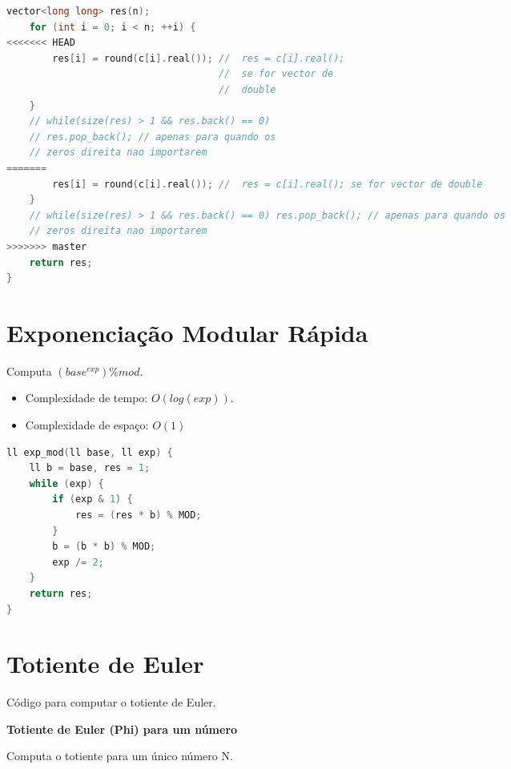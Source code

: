 \documentclass[11pt, a4paper, oneside]{book}
\begin{document}
\begin{multicols}{2}
\begin{lstlisting}[language=C++]
    vector<long long> res(n);
    for (int i = 0; i < n; ++i) {
<<<<<<< HEAD
        res[i] = round(c[i].real()); //  res = c[i].real();
                                     //  se for vector de
                                     //  double
    }
    // while(size(res) > 1 && res.back() == 0)
    // res.pop_back(); // apenas para quando os
    // zeros direita nao importarem
=======
        res[i] = round(c[i].real()); //  res = c[i].real(); se for vector de double
    }
    // while(size(res) > 1 && res.back() == 0) res.pop_back(); // apenas para quando os
    // zeros direita nao importarem
>>>>>>> master
    return res;
}
\end{lstlisting}
\end{multicols}

\hfill

\section{Exponenciação Modular Rápida}


Computa $(base^{exp}) \% mod$.



\begin{itemize}
\item Complexidade de tempo: $O(log(exp))$.
\item Complexidade de espaço: $O(1)$
\end{itemize}

\hfill

\begin{multicols}{2}
\begin{lstlisting}[language=C++]
ll exp_mod(ll base, ll exp) {
    ll b = base, res = 1;
    while (exp) {
        if (exp & 1) {
            res = (res * b) % MOD;
        }
        b = (b * b) % MOD;
        exp /= 2;
    }
    return res;
}
\end{lstlisting}
\end{multicols}

\hfill

\section{Totiente de Euler}


Código para computar o totiente de Euler.



\textbf{Totiente de Euler (Phi) para um número} 

Computa o totiente para um único número N.
\end{document}
